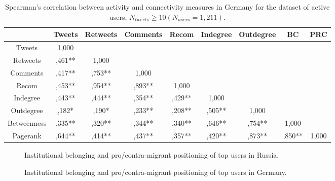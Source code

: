 \begin{table}[ht]%
	\centering
	\caption{Spearman’s correlation between activity and connectivity measures in Germany for the
		dataset of active users, \(N_{tweets} \geq 10 (N_{users} = 1,211)\).}%
	\label{tab:spearmanCorrelationGermanyActive}%
	\begin{adjustbox}{width=1\textwidth}
		\small
		\begin{tabular}{ c  c  c  c  c  c  c  c  c }%
			\toprule
			& Tweets & Retweets & Comments & Recom & Indegree & Outdegree & BC & PRC \\
			\hline
			Tweets & 1,000 &  &  &  &  &  &  & \\
			Retweets & ,461** & 1,000 &  &  &  &  &  & \\
			Comments & ,417** & ,753** & 1,000 &  &  &  &  & \\
			Recom & ,453** & ,954** & ,893**  & 1,000 &  &  &  & \\
			Indegree & ,443** & ,444** & ,354** & ,429** & 1,000 &  &  & \\
			Outdegree & ,182* & ,190* & ,233** & ,208** & ,505** & 1,000 &  & \\
			Betweenness & ,335** & ,320** & ,344** & ,340** & ,646** & ,754**  & 1,000 & \\
			Pagerank & ,644** & ,414** & ,437** & ,357** & ,420** & ,873** & ,850** & 1,000\\
			\bottomrule
		\end{tabular}%
	\end{adjustbox}
\end{table}

\begin{figure}[ht]
	\caption{Institutional belonging and pro/contra-migrant positioning of top users in Russia.}\label{fig:topUsersRussia}
\end{figure} 

\begin{figure}[ht]
	\caption{Institutional belonging and pro/contra-migrant positioning of top users in Germany.}\label{fig:topUsersGermany}
\end{figure} 

